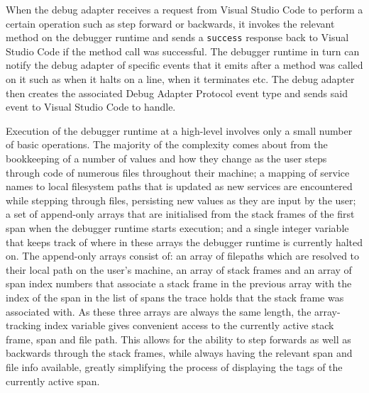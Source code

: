\documentclass[12pt,pdftex,titlepage]{report}
\begin{document}
                When the debug adapter receives a request from Visual Studio Code to perform a certain operation such as step forward or backwards, it invokes the relevant method on the debugger runtime and sends a \texttt{success} response back
                to Visual Studio Code if the method call was successful. The debugger runtime in turn can notify the debug adapter of specific events that it emits after a method was called on it such as when it halts on a line, when it terminates 
                etc. The debug adapter then creates the associated Debug Adapter Protocol event type and sends said event to Visual Studio Code to handle.

                \newpage
                Execution of the debugger runtime at a high-level involves only a small number of basic operations. The majority of the complexity comes about from the bookkeeping of a number of values and how they change as the user steps 
                through code of numerous files throughout their machine; a mapping of service names to local filesystem paths that is updated as new services are encountered while stepping through files, persisting new values as they are input
                by the user; a set of append-only arrays that are initialised from the stack frames of the first span when the debugger runtime starts execution; and a single integer variable that keeps track of where in these arrays the debugger
                runtime is currently halted on. The append-only arrays consist of: an array of filepaths which are resolved to their local path on the user's machine, an array of stack frames and an array of span index numbers that associate a stack 
                frame in the previous array with the index of the span in the list of spans the trace holds that the stack frame was associated with. As these three arrays are always the same length, the array-tracking index variable gives convenient
                access to the currently active stack frame, span and file path. This allows for the ability to step forwards as well as backwards through the stack frames, while always having the relevant span and file info available, greatly 
                simplifying the process of displaying the tags of the currently active span.
                
\end{document}
